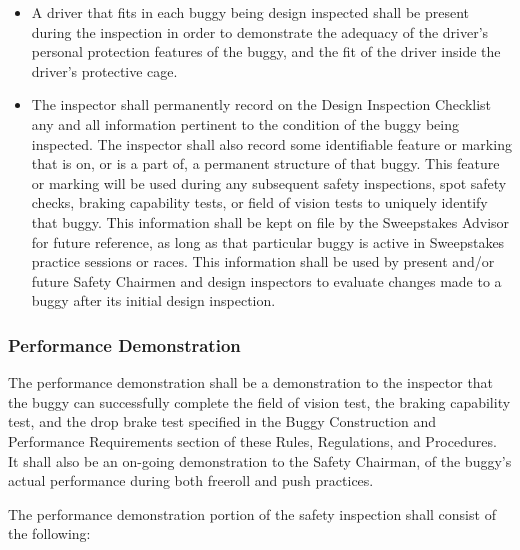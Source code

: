\begin{itemize}
		\item
		A driver that fits in each buggy being design inspected shall be present during
		the inspection in order to demonstrate the adequacy of the driver's personal
		protection features of the buggy, and the fit of the driver inside the driver's
		protective cage.

		\item
		The inspector shall permanently record on the Design Inspection Checklist any
		and all information pertinent to the condition of the buggy being inspected.
		The inspector shall also record some identifiable feature or marking that is
		on, or is a part of, a permanent structure of that buggy. This feature or
		marking will be used during any subsequent safety inspections, spot safety
		checks, braking capability tests, or field of vision tests to uniquely identify
		that buggy. This information shall be kept on file by the Sweepstakes Advisor
		for future reference, as long as that particular buggy is active in Sweepstakes
		practice sessions or races. This information shall be used by present and/or
		future Safety Chairmen and design inspectors to evaluate changes made to a
		buggy after its initial design inspection.

	\end{itemize}

\subsubsection{Performance Demonstration}

	The performance demonstration shall be a demonstration to the inspector that
	the buggy can successfully complete the field of vision test, the braking
	capability test, and the drop brake test specified in the Buggy Construction
	and Performance Requirements section of these Rules, Regulations, and
	Procedures. It shall also be an on-going demonstration to the Safety Chairman,
	of the buggy's actual performance during both freeroll and push practices.
	\newline

	\noindent The performance demonstration portion of the safety inspection shall consist of
	the following:

